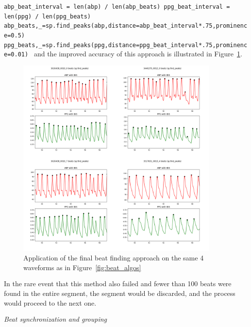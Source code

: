 \vspace{0.1cm}
{\centering \texttt{abp\_beat\_interval = len(abp) / len(abp\_beats) \newline
ppg\_beat\_interval = len(ppg) / len(ppg\_beats) \newline
abp\_beats,\_=sp.find\_peaks(abp,distance=abp\_beat\_interval*.75,prominence=0.5) \newline
ppg\_beats,\_=sp.find\_peaks(ppg,distance=ppg\_beat\_interval*.75,prominence=0.01) \newline}}
\vspace{0.1cm}
\noindent and the improved accuracy of this approach is illustrated in Figure~\ref{fig:sp_beats}.

\begin{figure}[h]
    \includegraphics[width=0.9\textwidth]{images/methods/sp_beats}
    \caption{Application of the final beat finding approach on the same 4 waveforms as in Figure~\ref{fig:beat_algos}}
    \label{fig:sp_beats}
\end{figure}

In the rare event that this method also failed and fewer than 100 beats were found in the entire segment, the segment would be discarded, and the process would proceed to the next one.

\vspace{0.2cm}
\textit{Beat synchronization and grouping}
\vspace{0.2cm}

